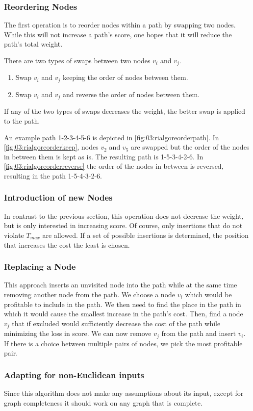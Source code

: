\subsubsection{Reordering Nodes}
\label{subsubsec:03:reorder}

The first operation is to reorder nodes within a path by swapping two nodes.
While this will not increase a path's score, one hopes that it will reduce the path's total weight.

There are two types of swaps between two nodes $v_i$ and $v_j$.
\begin{enumerate}
    \item Swap $v_i$ and $v_j$ keeping the order of nodes between them.
    \item Swap $v_i$ and $v_j$ and reverse the order of nodes between them.
\end{enumerate} 
If any of the two types of swaps decreases the weight, the better swap is applied to the path.

An example path 1-2-3-4-5-6 is depicted in \cref{fig:03:rialgoreorderpath}.
In \cref{fig:03:rialgoreorderkeep}, nodes $v_2$ and $v_5$ are swapped but the order of the nodes in between them is kept as is.
The resulting path is 1-5-3-4-2-6.
In \cref{fig:03:rialgoreorderreverse} the order of the nodes in between is reversed, resulting in the path 1-5-4-3-2-6. 

\subsubsection{Introduction of new Nodes}

In contrast to the previous section, this operation does not decrease the weight, but is only interested in increasing score.
Of course, only insertions that do not violate $T_{max}$ are allowed.
If a set of possible insertions is determined, the position that increases the cost the least is chosen.

\subsubsection{Replacing a Node}

This approach inserts an unvisited node into the path while at the same time removing another node from the path.
We choose a node $v_i$ which would be profitable to include in the path.
We then need to find the place in the path in which it would cause the smallest increase in the path's cost.
Then, find a node $v_j$ that if excluded would sufficiently decrease the cost of the path while minimizing the loss in score.
We can now remove $v_j$ from the path and insert $v_i$.
If there is a choice between multiple pairs of nodes, we pick the most profitable pair.

\subsubsection{Adapting for non-Euclidean inputs}

Since this algorithm does not make any assumptions about its input, except for graph completeness it should work on any graph that is complete.
 